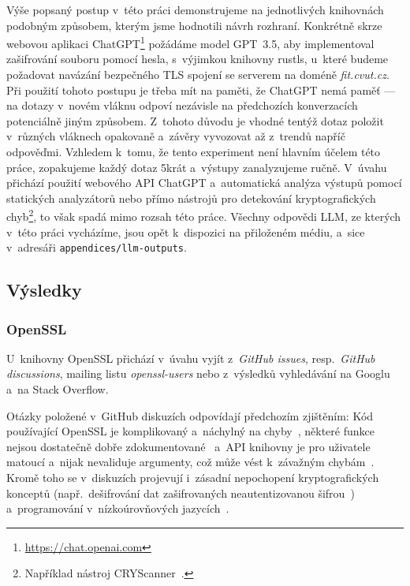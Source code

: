 Výše popsaný postup v~této práci demonstrujeme na jednotlivých knihovnách podobným způsobem, kterým jsme hodnotili návrh rozhraní. Konkrétně skrze webovou aplikaci ChatGPT\footnote{\url{https://chat.openai.com}} požádáme model GPT~3.5, aby implementoval zašifrování souboru pomocí hesla, s~výjimkou knihovny rustls, u~které budeme požadovat navázání bezpečného TLS spojení se serverem na doméně \textit{fit.cvut.cz}. Při použití tohoto postupu je třeba mít na paměti, že ChatGPT nemá paměť --- na dotazy v~novém vláknu odpoví nezávisle na předchozích konverzacích potenciálně jiným způsobem. Z~tohoto důvodu je vhodné tentýž dotaz položit v~různých vláknech opakovaně a~závěry vyvozovat až z~trendů napříč odpověďmi. Vzhledem k~tomu, že tento experiment není hlavním účelem této práce, zopakujeme každý dotaz 5krát a~výstupy zanalyzujeme ručně. V~úvahu přichází použití webového API ChatGPT a~automatická analýza výstupů pomocí statických analyzátorů nebo přímo nástrojů pro detekování kryptografických chyb\footnote{Například nástroj CRYScanner~\cite{cryscanner}.}, to však spadá mimo rozsah této práce. Všechny odpovědi LLM, ze kterých v~této práci vycházíme, jsou opět k~dispozici na přiloženém médiu, a~sice v~adresáři \texttt{appendices/llm-outputs}.

\subsection{Výsledky}

\subsubsection*{OpenSSL}

U~knihovny OpenSSL přichází v~úvahu vyjít z~\textit{GitHub issues}, resp.\ \textit{GitHub discussions}, mailing listu \textit{openssl-users} nebo z~výsledků vyhledávání na Googlu a~na Stack Overflow.

Otázky položené v~GitHub diskuzích odpovídají předchozím zjištěním: Kód používající Open\-SSL je komplikovaný a~náchylný na chyby~\cite{openssl-disc-22838}, některé funkce nejsou dostatečně dobře zdokumentované~\cite{openssl-disc-23026} a~API knihovny je pro uživatele matoucí a~nijak nevaliduje argumenty, což může vést k~závažným chybám~\cite{openssl-disc-21610}. Kromě toho se v~diskuzích projevují i~zásadní nepochopení kryptografických konceptů (např.\ dešifrování dat zašifrovaných neautentizovanou šifrou~\cite{openssl-disc-23198}) a~programování v~nízkoúrovňových jazycích~\cite{openssl-disc-22170}.

